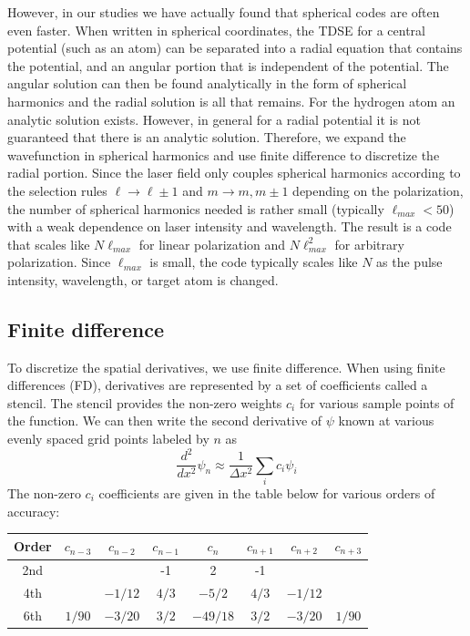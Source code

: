 However, in our studies we have actually found that spherical codes are often even faster. When written in spherical coordinates, the TDSE for a central potential (such as an atom) can be separated into a radial equation that contains the potential, and an angular portion that is independent of the potential. The angular solution can then be found analytically in the form of spherical harmonics and
the radial solution is all that remains. For the hydrogen atom an analytic solution exists. However, in general for a radial potential it is not guaranteed that there is an analytic solution. Therefore, we expand the wavefunction in spherical harmonics and use finite difference to discretize the radial portion. Since the laser field only couples spherical harmonics according to the selection rules $\ell \rightarrow \ell \pm1$ and $m \rightarrow m, m\pm1$ depending on the polarization, the number of spherical harmonics needed is rather small (typically $\ell_{max}<50$) with a weak dependence on laser intensity and wavelength. The result is a code that scales like $N\ell_{max}$ for linear polarization and $N\ell_{max}^2$ for arbitrary polarization. Since $\ell_{max}$ is small, the code typically scales like $N$ as the pulse intensity, wavelength, or target atom is changed.

\subsection{Finite difference} %
\label{sub:finite_difference}
To discretize the spatial derivatives, we use finite difference. When using finite differences (FD), derivatives are represented by a set of coefficients called a stencil. The stencil provides the non-zero weights $c_i$ for various sample points of the function. We can then write the second derivative of $\psi$ known at various evenly spaced grid points labeled by $n$ as
\begin{equation}
    \frac{d^2}{dx^2}\psi_n \approx \frac{1}{\Delta x^2}\sum_i c_i \psi_i
    \label{eq:finite_diff}
\end{equation}
The non-zero $c_i$ coefficients are given in the table below for various orders of accuracy:
\begin{center}
\begin{tabular}{ |c|c|c|c|c|c|c|c| }
\hline
Order & $c_{n-3}$ & $c_{n-2}$ & $c_{n-1}$ & $c_{n}$ & $c_{n+1}$ & $c_{n+2}$ & $c_{n+3}$ \\ \hline
2nd   &      &      & -1   & 2  & -1   &      &      \\ \hline
4th   &      & $-1/12$ & $4/3$   & $-5/2$  & $4/3$   &  $-1/12$    &      \\ \hline
6th   &   $1/90$   &  $-3/20$    & $3/2$   & $-49/18$  & $3/2$   &   $-3/20$    &   $1/90$  \\ \hline
\end{tabular}
\end{center}

